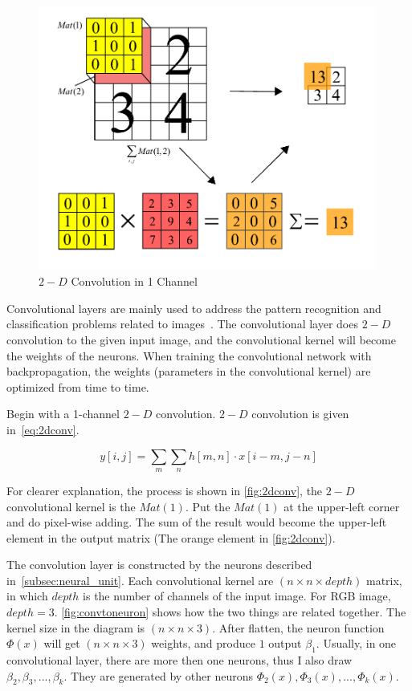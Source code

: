 \begin{spacing}{1.5}
\begin{figure}[ht]
\centering
\includegraphics[width=0.99\textwidth, fbox]{Chapter2/2dconv.pdf}
\caption{$2-D$ Convolution in 1 Channel}
\label{fig:2dconv} 
\end{figure}

Convolutional layers are mainly used to address the pattern recognition and classification problems related to images~\cite{o2015introduction}. The convolutional layer does $2-D$ convolution to the given input image, and the convolutional kernel will become the weights of the neurons. When training the convolutional network with backpropagation, the weights (parameters in the convolutional kernel) are optimized from time to time.

Begin with a 1-channel $2-D$ convolution. $2-D$ convolution is given in~\autoref{eq:2dconv}.

\begin{equation}
\label{eq:2dconv}
    y[i,j]= \sum_m \sum_n h[m,n] \cdot x[i-m,j-n]
\end{equation}

For clearer explanation, the process is shown in \autoref{fig:2dconv}, the $2-D$ convolutional kernel is the $Mat(1)$. Put the $Mat(1)$ at the upper-left corner and do pixel-wise adding. The sum of the result would become the upper-left element in the output matrix (The orange element in \autoref{fig:2dconv}).

The convolution layer is constructed by the neurons described in~\autoref{subsec:neural_unit}. Each convolutional kernel are $(n \times n \times depth)$ matrix, in which $depth$ is the number of channels of the input image. For RGB image, $depth = 3$. \autoref{fig:convtoneuron} shows how the two things are related together. The kernel size in the diagram is $(n \times n \times 3)$. After flatten, the neuron function $\Phi(x)$ will get $(n \times n \times 3)$ weights, and produce $1$ output $\beta_1$. Usually, in one convolutional layer, there are more then one neurons, thus I also draw $\beta_2, \beta_3, ..., \beta_k$. They are generated by other neurons $\Phi_2(x), \Phi_3(x), ..., \Phi_k(x)$.


\end{spacing}
